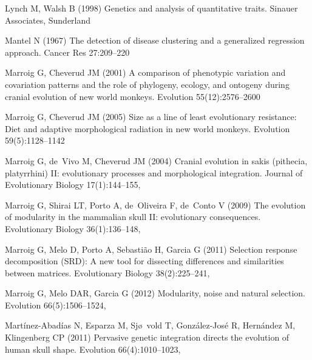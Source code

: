 \documentclass [twocolumn, natbib, nospthms, 10pt] {svjour3}
\begin{document}
\begin{thebibliography}{77}
Lynch M, Walsh B (1998) Genetics and analysis of quantitative traits. Sinauer
  Associates, Sunderland

Mantel N (1967) The detection of disease clustering and a generalized
  regression approach. Cancer Res 27:209–220

Marroig G, Cheverud JM (2001) A comparison of phenotypic variation and
  covariation patterns and the role of phylogeny, ecology, and ontogeny during
  cranial evolution of new world monkeys. Evolution 55(12):2576–2600

Marroig G, Cheverud JM (2005) Size as a line of least evolutionary resistance:
  Diet and adaptive morphological radiation in new world monkeys. Evolution
  59(5):1128–1142

Marroig G, de~Vivo M, Cheverud JM (2004) Cranial evolution in sakis (pithecia,
  platyrrhini) {II}: evolutionary processes and morphological integration.
  Journal of Evolutionary Biology 17(1):144–155,

Marroig G, Shirai LT, Porto A, de~Oliveira F, de~Conto V (2009) The evolution
  of modularity in the mammalian skull {II}: evolutionary consequences.
  Evolutionary Biology 36(1):136–148, 

Marroig G, Melo D, Porto A, Sebastião H, Garcia G (2011) Selection response
  decomposition ({SRD}): A new tool for dissecting differences and similarities
  between matrices. Evolutionary Biology 38(2):225–241,

Marroig G, Melo DAR, Garcia G (2012) Modularity, noise and natural selection.
  Evolution 66(5):1506–1524, 

Martínez-Abadías N, Esparza M, Sjø~vold T, González-José R, Hernández M,
  Klingenberg CP (2011) Pervasive genetic integration directs the evolution of
  human skull shape. Evolution 66(4):1010–1023, 


\end{thebibliography}
\end{document}
